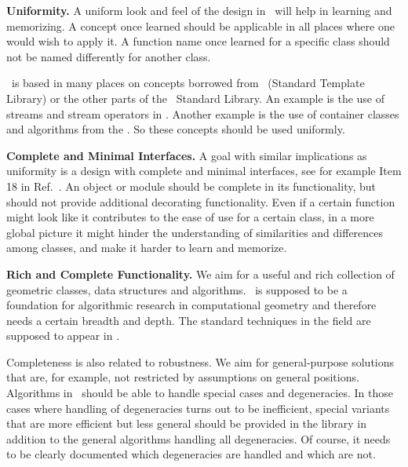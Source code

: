 {\bf Uniformity.}
A uniform look and feel of the design in \cgal\ will help in learning
and memorizing. A concept once learned should be applicable in all
places where one would wish to apply it. 
A function name once learned for a specific
class should not be named differently for another class. 

 \ccIndexMainItem{\stl} \cgal\ is
based in many places on concepts borrowed from \stl\ (Standard
Template Library) or the other parts of the \CC\ Standard Library. An
example is the use of streams and stream operators in \cgal. Another
example is the use of container classes and algorithms from the
\stl. So these concepts should be used uniformly.

{\bf Complete and Minimal Interfaces.}
A goal with similar implications as uniformity is a design
with complete and minimal interfaces, see for example Item 18 
in Ref.~\cite{cgal:m-ec-97}.
An object or module should be complete in its 
functionality, but should
not provide additional decorating functionality. Even if a certain
function might look like it contributes to the ease of use for a certain 
class, in a more global picture it might hinder the understanding of 
similarities and differences among classes, and make it harder to learn 
and memorize.

{\bf Rich and Complete Functionality.}
We aim for a useful and rich collection of geometric classes, data
structures and algorithms. \cgal\ is supposed to be a foundation for
algorithmic research in computational geometry and therefore needs a
certain breadth and depth. The standard techniques in the field are
supposed to appear in \cgal. 

Completeness is also related to robustness.
We aim for general-purpose
solutions that are, for example, not restricted by assumptions on
general positions. Algorithms in \cgal\ should be able to handle
special cases and degeneracies. 
In those cases where handling of degeneracies turns out to be
inefficient, special variants that are more efficient but less general
should be provided in the library in addition to the general 
algorithms handling all degeneracies. Of course, it needs to be
clearly documented which degeneracies are handled and which are not.

